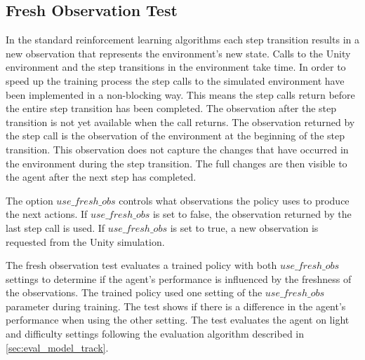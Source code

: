 \subsection{Fresh Observation Test}

In the standard reinforcement learning algorithms each step transition results in a new observation that represents the environment's new state. Calls to the Unity environment and the step transitions in the environment take time. In order to speed up the training process the step calls to the simulated environment have been implemented in a non-blocking way. This means the step calls return before the entire step transition has been completed. The observation after the step transition is not yet available when the call returns. The observation returned by the step call is the observation of the environment at the beginning of the step transition. This observation does not capture the changes that have occurred in the environment during the step transition. The full changes are then visible to the agent after the next step has completed.

The option $use\_fresh\_obs$ controls what observations the policy uses to produce the next actions. If $use\_fresh\_obs$ is set to false, the observation returned by the last step call is used. If $use\_fresh\_obs$ is set to true, a new observation is requested from the Unity simulation.

The fresh observation test evaluates a trained policy with both $use\_fresh\_obs$ settings to determine if the agent's performance is influenced by the freshness of the observations. The trained policy used one setting of the $use\_fresh\_obs$ parameter during training. The test shows if there is a difference in the agent's performance when using the other setting. The test evaluates the agent on light and difficulty settings following the evaluation algorithm described in \ref{sec:eval_model_track}.









